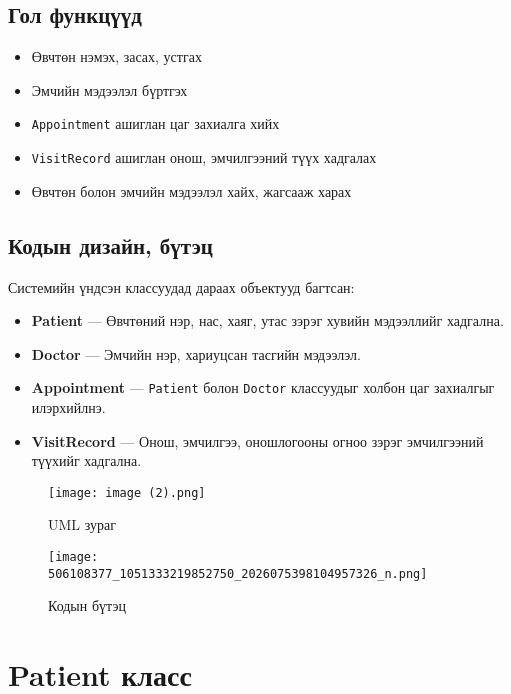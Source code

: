 \documentclass[12pt]{article}
\begin{document}
\subsection*{Гол функцүүд}

\begin{itemize}
  \item Өвчтөн нэмэх, засах, устгах
  \item Эмчийн мэдээлэл бүртгэх
  \item \texttt{Appointment} ашиглан цаг захиалга хийх
  \item \texttt{VisitRecord} ашиглан онош, эмчилгээний түүх хадгалах
  \item Өвчтөн болон эмчийн мэдээлэл хайх, жагсааж харах
\end{itemize}

\subsection*{Кодын дизайн, бүтэц}

Системийн үндсэн классуудад дараах объектууд багтсан:

\begin{itemize}
  \item \textbf{Patient} — Өвчтөний нэр, нас, хаяг, утас зэрэг хувийн мэдээллийг хадгална.
  \item \textbf{Doctor} — Эмчийн нэр, хариуцсан тасгийн мэдээлэл.
  \item \textbf{Appointment} — \texttt{Patient} болон \texttt{Doctor} классуудыг холбон цаг захиалгыг илэрхийлнэ.
  \item \textbf{VisitRecord} — Онош, эмчилгээ, оношлогооны огноо зэрэг эмчилгээний түүхийг хадгална.
\end{itemize}

\begin{figure}[h]
    \centering
    \texttt{[image: image (2).png]}
    \caption{UML зураг}
    \label{fig:uml-diagram}
\end{figure}

\begin{figure}[h]
    \centering
    \texttt{[image: 506108377\_1051333219852750\_2026075398104957326\_n.png]}
    \caption{Кодын бүтэц}
    \label{fig:system-structure}
\end{figure}

\newpage

\section*{Patient класс}
\end{document}
